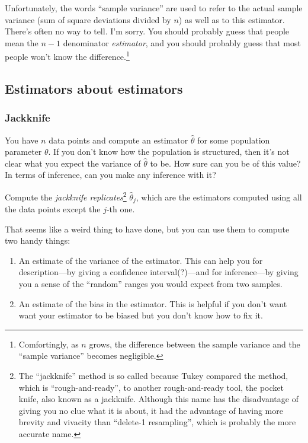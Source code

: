 \documentclass{book}
\providecommand{\tightlist}{%
  \setlength{\itemsep}{0pt}\setlength{\parskip}{0pt}}
\begin{document}
Unfortunately, the words ``sample variance'' are used to refer to the
actual sample variance (sum of square deviations divided by \(n\)) as
well as to this estimator. There's often no way to tell. I'm sorry. You
should probably guess that people mean the \(n-1\) denominator
\emph{estimator}, and you should probably guess that most people won't
know the difference.\footnote{Comfortingly, as \(n\) grows, the
  difference between the sample variance and the ``sample variance''
  becomes negligible.}

\subsection{Estimators about
estimators}\label{estimators-about-estimators}

\subsubsection{Jackknife}\label{jackknife}

You have \(n\) data points and compute an estimator \(\hat{\theta}\) for
some population parameter \(\theta\). If you don't know how the
population is structured, then it's not clear what you expect the
variance of \(\hat{\theta}\) to be. How sure can you be of this value?
In terms of inference, can you make any inference with it?

Compute the \emph{jackknife replicates}\footnote{The ``jackknife''
  method is so called because Tukey compared the method, which is
  ``rough-and-ready'', to another rough-and-ready tool, the pocket
  knife, also known as a jackknife. Although this name has the
  disadvantage of giving you no clue what it is about, it had the
  advantage of having more brevity and vivacity than ``delete-1
  resampling'', which is probably the more accurate name.}
\(\hat{\theta}_j\), which are the estimators computed using all the data
points except the \(j\)-th one.

That seems like a weird thing to have done, but you can use them to
compute two handy things:

\begin{enumerate}
\def\labelenumi{\arabic{enumi}.}
\tightlist
\item
  An estimate of the variance of the estimator. This can help you for
  description---by giving a confidence interval(?)---and for
  inference---by giving you a sense of the ``random'' ranges you would
  expect from two samples.
\item
  An estimate of the bias in the estimator. This is helpful if you don't
  want want your estimator to be biased but you don't know how to fix
  it.
\end{enumerate}
\end{document}
